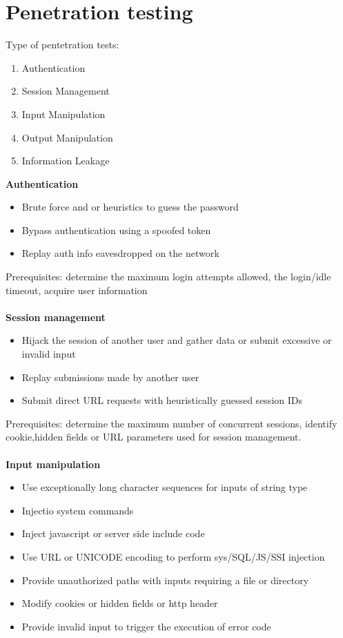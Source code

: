 \documentclass[10pt,a4paper]{article}
\begin{document}
\section{Penetration testing}
Type of pentetration tests:
\begin{enumerate}
\item Authentication
\item Session Management
\item Input Manipulation
\item Output Manipulation
\item Information Leakage
\end{enumerate}
\textbf{Authentication}
\begin{itemize}
\item Brute force and or heuristics to guess the password
\item Bypass authentication using a spoofed token
\item Replay auth info eavesdropped on the network
\end{itemize} 
Prerequisites: determine the maximum login attempts allowed, the login/idle timeout, acquire user information\\\\
\textbf{Session management}
\begin{itemize}
\item Hijack the session of another user and gather data or submit excessive or invalid input
\item Replay submissions made by another user
\item Submit direct URL requests with heuristically guessed session IDs
\end{itemize}
Prerequisites: determine the maximum number of concurrent sessions, identify cookie,hidden fields or URL parameters used for session management.\\\\
\textbf{Input manipulation}\\
\begin{itemize}
\item Use exceptionally long character sequences for inputs of string type
\item Injectio system commands
\item Inject javascript or server side include code
\item Use URL or UNICODE encoding to perform sys/SQL/JS/SSI injection
\item Provide unauthorized paths with inputs requiring a file or directory
\item Modify cookies or hidden fields or http header
\item Provide invalid input to trigger the execution of error code
\end{itemize}
\end{document}
